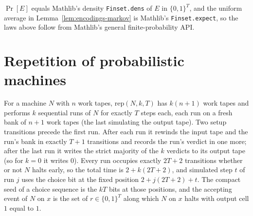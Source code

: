 \begin{lemma}
  \label{lem:encodings-eventprob-dens}
  $\Pr[E]$ equals Mathlib's density \texttt{Finset.dens} of $E$ in
  $\{0,1\}^T$, and the uniform average in Lemma~\ref{lem:encodings-markov} is
  Mathlib's \texttt{Finset.expect}, so the laws above follow from Mathlib's
  general finite-probability API.
\end{lemma}

\section{Repetition of probabilistic machines}

\begin{definition}
  \label{def:encodings-repeat}
  \leanok
  For a machine $N$ with $n$ work tapes, $\mathrm{rep}(N, k, T)$ has $k(n+1)$
  work tapes and performs $k$ sequential runs of $N$ for exactly $T$ steps
  each, each run on a fresh bank of $n + 1$ work tapes (the last simulating
  the output tape). Two setup transitions precede the first run. After each
  run it rewinds the input tape and the run's bank in exactly $T + 1$
  transitions and records the run's verdict in one more; after the last run
  it writes the strict majority of the $k$ verdicts to its output tape (so for
  $k = 0$ it writes $0$). Every run occupies exactly $2T + 2$ transitions
  whether or not $N$ halts early, so the total time is $2 + k(2T + 2)$, and
  simulated step $t$ of run $j$ uses the choice bit at the fixed position
  $2 + j(2T + 2) + t$. The compact seed of a choice sequence is the $kT$ bits
  at those positions, and the accepting event of $N$ on $x$ is the set of
  $r \in \{0,1\}^T$ along which $N$ on $x$ halts with output cell $1$ equal
  to $1$.
\end{definition}

